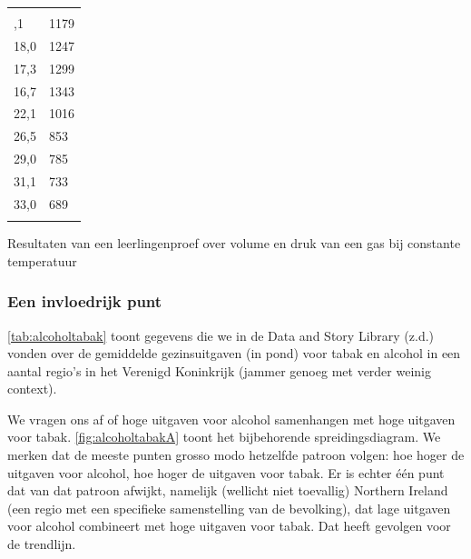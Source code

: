 \begin{multicols}{2}
\begin{tabel}
	\begin{tabular}{C{3cm} C{3cm}}
		\hlinethick
		 &  \\
		,1 & 1179 \\
        18,0 & 1247 \\
        17,3 & 1299 \\
        16,7 & 1343 \\
        22,1 & 1016 \\
        26,5 & 853 \\
        29,0 & 785 \\
        31,1 & 733 \\
        33,0 & 689 \\
		\hlinethick
		\end{tabular}
	\caption{Resultaten van een leerlingenproef over volume en druk van een gas bij constante temperatuur} \label{tab:volumedrukA}
\end{tabel}

    \subsubsection*{Een invloedrijk punt}

\autoref{tab:alcoholtabak} toont gegevens die we in de Data and Story Library (z.d.) vonden over de gemiddelde gezinsuitgaven (in pond) voor tabak en alcohol in een aantal regio’s in het Verenigd Koninkrijk (jammer genoeg met verder weinig context).

We vragen ons af of hoge uitgaven voor alcohol samenhangen met hoge uitgaven voor tabak. \autoref{fig:alcoholtabakA} toont het bijbehorende spreidingsdiagram. We merken dat de meeste punten grosso modo hetzelfde patroon volgen: hoe hoger de uitgaven voor alcohol, hoe hoger de uitgaven voor tabak. Er is echter één punt dat van dat patroon afwijkt, namelijk (wellicht niet toevallig) Northern Ireland (een regio met een specifieke samenstelling van de bevolking), dat lage uitgaven voor alcohol combineert met hoge uitgaven voor tabak. Dat heeft gevolgen voor de trendlijn.


\end{multicols}
